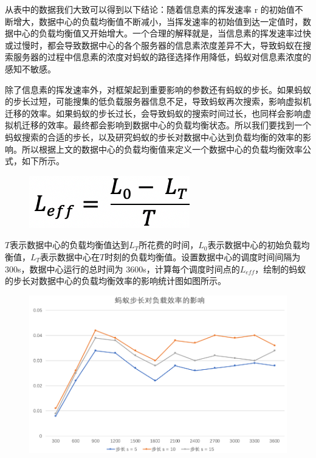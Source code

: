 从表中的数据我们大致可以得到以下结论：随着信息素的挥发速率 r 的初始值不断增大，数据中心的负载均衡值不断减小，当挥发速率的初始值到达一定值时，数据中心的负载均衡值又开始增大。一个合理的解释就是，当信息素的挥发速率过快或过慢时，都会导致数据中心的各个服务器的信息素浓度差异不大，导致蚂蚁在搜索服务器的过程中信息素的浓度对蚂蚁的路径选择作用降低，蚂蚁对信息素浓度的感知不敏感。

除了信息素的挥发速率外，对框架起到重要影响的参数还有蚂蚁的步长。如果蚂蚁的步长过短，可能搜集的低负载服务器信息不足，导致蚂蚁再次搜索，影响虚拟机迁移的效率。如果蚂蚁的步长过长，会导致蚂蚁的搜索时间过长，也同样会影响虚拟机迁移的效率。最终都会影响到数据中心的负载均衡状态。所以我们要找到一个蚂蚁搜索的合适的步长，以及研究蚂蚁的步长对数据中心达到负载均衡的效率的影响。所以根据上文的数据中心的负载均衡值来定义一个数据中心的负载均衡效率公式，如下所示。

\begin{figure}[htb]
  \centering
  \includegraphics[width=0.2\linewidth]{./Figure/IMG_Chap4_6.png}
\end{figure}

$ T $表示数据中心的负载均衡值达到$ L_T $所花费的时间，$ L_0 $表示数据中心的初始负载均衡值，$ L_T $表示数据中心在$ T $时刻的负载均衡值。设置数据中心的调度时间间隔为 300s，数据中心运行的总时间为 3600s，计算每个调度时间点的$ L_{eff} $，绘制的蚂蚁的步长对数据中心的负载均衡效率的影响统计图如图所示。

\begin{figure}[htb]
  \centering
  \includegraphics{./Figure/IMG_Chap4_7.png}
\end{figure}


